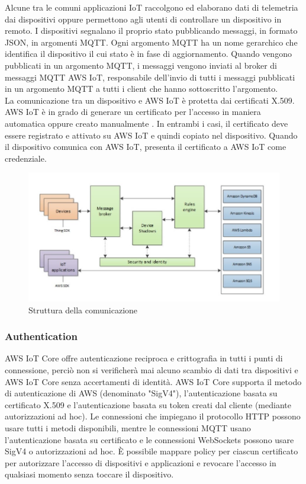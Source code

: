 Alcune tra le comuni applicazioni IoT raccolgono ed elaborano dati di telemetria dai dispositivi oppure permettono agli utenti di controllare un dispositivo in remoto. I dispositivi segnalano il proprio stato pubblicando messaggi, in formato JSON, in argomenti MQTT. Ogni argomento MQTT ha un nome gerarchico che identifica il dispositivo il cui stato è in fase di aggiornamento. Quando vengono pubblicati in un argomento MQTT, i messaggi vengono inviati al broker di messaggi MQTT AWS IoT, responsabile dell'invio di tutti i messaggi pubblicati in un argomento MQTT a tutti i client che hanno sottoscritto l'argomento.\\
La comunicazione tra un dispositivo e AWS IoT è protetta dai certificati X.509.\\
AWS IoT è in grado di generare un certificato per l'accesso in maniera automatica oppure creato manualmente . In entrambi i
casi, il certificato deve essere registrato e attivato su AWS IoT e quindi copiato nel dispositivo. Quando il dispositivo comunica con AWS IoT, presenta il certificato a AWS IoT come credenziale.\\
\begin{figure}
	\begin{center}
		\includegraphics[width=0.9\columnwidth]{images/aws_structure}
	\end{center}
	\caption{Struttura della comunicazione}
	\label{fig:aws_structure}
\end{figure}


\subsubsection{Authentication}
AWS IoT Core offre autenticazione reciproca e crittografia in tutti i punti di connessione, perciò non si verificherà mai alcuno scambio di dati tra dispositivi e AWS IoT Core senza accertamenti di identità. AWS IoT Core supporta il metodo di autenticazione di AWS (denominato "SigV4"), l'autenticazione basata su certificato X.509 e l'autenticazione basata su token creati dal cliente (mediante autorizzazioni ad hoc). Le connessioni che impiegano il protocollo HTTP possono usare tutti i metodi disponibili, mentre le connessioni MQTT usano l'autenticazione basata su certificato e le connessioni WebSockets possono usare SigV4 o autorizzazioni ad hoc. È possibile mappare policy per ciascun certificato per autorizzare l'accesso di dispositivi e applicazioni e revocare l'accesso in qualsiasi momento senza toccare il dispositivo.

